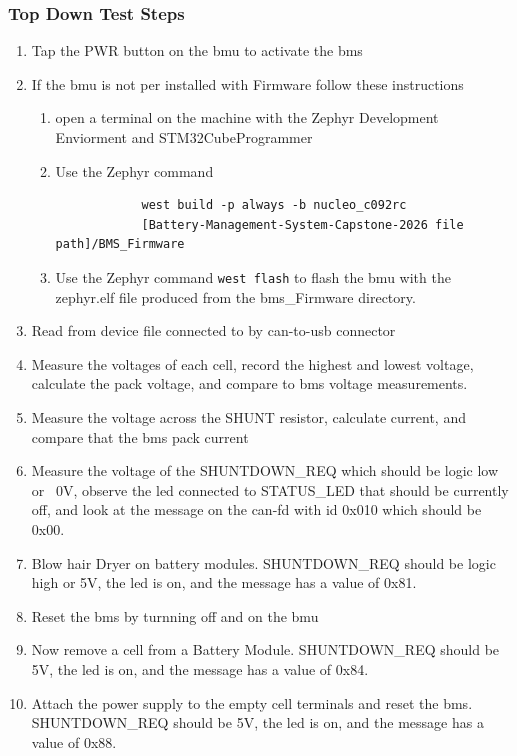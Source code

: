 \subsubsection{Top Down Test Steps}
\begin{enumerate}
	\item Tap the PWR button on the \gls{bmu} to activate the \gls{bms}
	\item If the \gls{bmu} is not per installed with Firmware follow these instructions \begin{enumerate}
		\item open a terminal on the machine with the Zephyr Development Enviorment and STM32CubeProgrammer
		\item Use the Zephyr command  \begin{verbatim}
			west build -p always -b nucleo_c092rc 
			[Battery-Management-System-Capstone-2026 file path]/BMS_Firmware
		\end{verbatim}
		\item Use the Zephyr command \verb|west flash| to flash the \gls{bmu} with the zephyr.elf file produced from the \gls{bms}\_Firmware directory.
	\end{enumerate}
	\item Read from device file connected to by \gls{can}-to-\gls{usb} connector
	\item Measure the voltages of each cell, record the highest and lowest voltage, calculate the pack voltage, and compare to \gls{bms} voltage measurements.
	\item Measure the voltage across the SHUNT resistor, calculate current, and compare that the \gls{bms} pack current
	\item Measure the voltage of the SHUNTDOWN\_REQ which should be logic low or ~0V, observe the \gls{led} connected to STATUS\_LED that should be currently off, and look at the message on the \gls{can-fd} with id 0x010 which should be 0x00.
	\item Blow hair Dryer on battery modules. SHUNTDOWN\_REQ should be logic high or 5V, the \gls{led} is on, and the message has a value of 0x81.
	\item Reset the \gls{bms} by turnning off and on the \gls{bmu}
	\item Now remove a cell from a Battery Module. SHUNTDOWN\_REQ should be 5V, the \gls{led} is on, and the message has a value of 0x84.
	\item Attach the power supply to the empty cell terminals and reset the \gls{bms}. SHUNTDOWN\_REQ should be 5V, the \gls{led} is on, and the message has a value of 0x88.

\end{enumerate}
